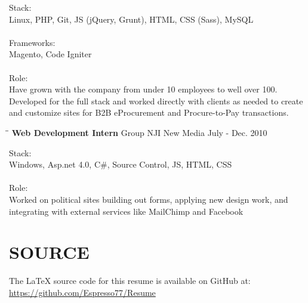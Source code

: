 \documentclass{res}
\begin{document}
\begin{resume}
    Stack: \\
	Linux, PHP, Git, JS (jQuery, Grunt), HTML, CSS (Sass), MySQL \\
	\\
	Frameworks: \\
	Magento, Code Igniter \\
	\\
	Role: \\
	Have grown with the company from under 10 employees to well over 100. 
	Developed for the full stack and worked directly with clients as needed to
	create and customize sites for B2B eProcurement and Procure-to-Pay transactions. 
    
   \begin{tabbing}
		\hspace{2.3in}\= \hspace{2.6in}\= \kill %
		\textbf{Web Development Intern} \>Group NJI New Media \> July - Dec. 2010 \\
   \end{tabbing}\vspace{-20pt}
   
    Stack: \\
	Windows, Asp.net 4.0, C\#, Source Control, JS, HTML, CSS \\
	\\
	Role: \\
	Worked on political sites building out forms, applying new design work, and integrating 
	with external services like MailChimp and Facebook\\
	
\section{SOURCE}
	The LaTeX source code for this resume is available on GitHub at: \\
	\url{https://github.com/Espresso77/Resume}
 
\end{resume}
\end{document}
